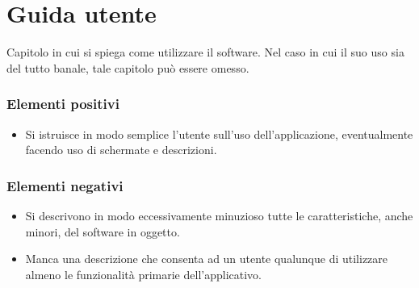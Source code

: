 \documentclass[a4paper,12pt]{report}
\begin{document}
\appendix
\chapter{Guida utente}

Capitolo in cui si spiega come utilizzare il software. Nel caso in cui il suo uso sia del tutto banale, tale capitolo può essere omesso.

\subsection*{Elementi positivi}

\begin{itemize}
 \item Si istruisce in modo semplice l'utente sull'uso dell'applicazione, eventualmente facendo uso di schermate e descrizioni.
\end{itemize}

\subsection*{Elementi negativi}
\begin{itemize}
 \item Si descrivono in modo eccessivamente minuzioso tutte le caratteristiche, anche minori, del software in oggetto.
 \item Manca una descrizione che consenta ad un utente qualunque di utilizzare almeno le funzionalità primarie dell'applicativo.
\end{itemize}



\end{document}
